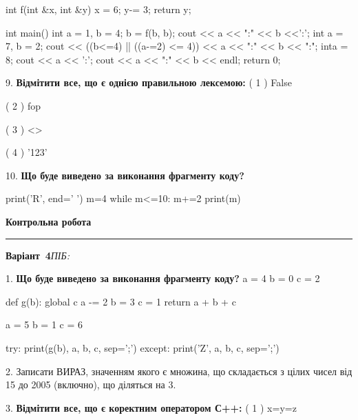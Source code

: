 \documentclass[11pt]{article}
\begin{document}
int f(int &x, int &y){
    x = 6;
    y-= 3;
    return y;
}

int main(){
    int a = 1, b = 4;
    b = f(b, b);
    cout << a << ":" << b <<':';
    {
        int a = 7, b = 2;
        cout << ((b<=4) || ((a-=2) <= 4))
             << a << ":" << b << ":";
    }
    {
        inta = 8;
        cout << a << ':';
    }
    cout << a << ":" << b << endl;
    return 0;
}

\par\vspace{5mm}
9. %
\textbf{Відмітити все, що є однією правильною лексемою:}
( 1 ) False

( 2 ) fop

( 3 ) <>

( 4 ) '123'
\par\vspace{5mm}
10. \textbf{Що буде виведено за виконання фрагменту коду?}

print('R', end=' ')
m=4
while m<=10:
    m+=2
print(m)

\par\vspace{5mm}










\newpage

\newpage

{\centering\Large\bfseries Контрольна робота\par}
\medskip
\noindent\rule{\linewidth}{0.5pt}
\smallskip
\noindent\textbf{Варіант \No\,4}\hfill \textit{ПІБ:}\,\underline{\hspace{60mm}}
\vspace{4mm}

1. \textbf{Що буде виведено за виконання фрагменту коду?}
a = 4
b = 0
c = 2

def g(b):
global c    a -= 2
    b = 3
    c = 1
    return a + b + c

a = 5
b = 1
c = 6

try:
    print(g(b), a, b, c, sep=';')
except:
    print('Z', a, b, c, sep=';')
\par\vspace{5mm}
2. 
Записати ВИРАЗ, значенням якого є множина, що складається з цілих чисел від 15 до 2005 (включно), що діляться на 3.\par\vspace{5mm}
3. %
\textbf{Відмітити все, що є коректним оператором С++:}
( 1 ) x=y=z
\end{document}
